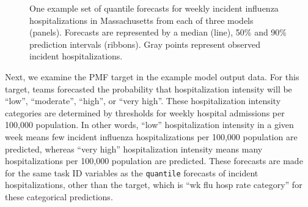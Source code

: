\documentclass[
  letterpaper,
  DIV=11,
  numbers=noendperiod]{scrartcl}
\begin{document}
\begin{figure}[H]


\caption{\label{fig-plot-ex-mods}One example set of quantile forecasts
for weekly incident influenza hospitalizations in Massachusetts from
each of three models (panels). Forecasts are represented by a median
(line), 50\% and 90\% prediction intervals (ribbons). Gray points
represent observed incident hospitalizations.}

\end{figure}%

Next, we examine the PMF target in the example model output data. For
this target, teams forecasted the probability that hospitalization
intensity will be ``low'', ``moderate'', ``high'', or ``very high''.
These hospitalization intensity categories are determined by thresholds
for weekly hospital admissions per 100,000 population. In other words,
``low'' hospitalization intensity in a given week means few incident
influenza hospitalizations per 100,000 population are predicted, whereas
``very high'' hospitalization intensity means many hospitalizations per
100,000 population are predicted. These forecasts are made for the same
task ID variables as the \texttt{quantile} forecasts of incident
hospitalizations, other than the target, which is ``wk flu hosp rate
category'' for these categorical predictions.
\end{document}
